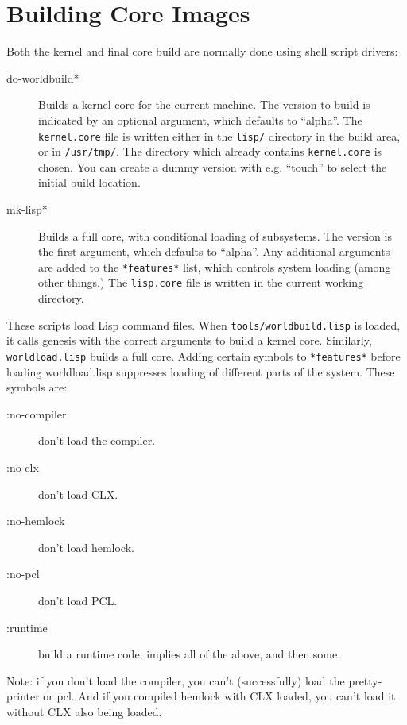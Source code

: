 \section{Building Core Images}
\label{building-cores}
Both the kernel and final core build are normally done using shell script
drivers:
\begin{description}
\item[do-worldbuild*] Builds a kernel core for the current machine.  The
version to build is indicated by an optional argument, which defaults to
``alpha''.  The \verb|kernel.core| file is written either in the \verb|lisp/|
directory in the build area, or in \verb|/usr/tmp/|.  The directory which
already contains \verb|kernel.core| is chosen.  You can create a dummy version
with e.g. ``touch'' to select the initial build location.

\item[mk-lisp*] Builds a full core, with conditional loading of subsystems.
The version is the first argument, which defaults to ``alpha''.  Any additional
arguments are added to the \verb|*features*| list, which controls system
loading (among other things.)  The \verb|lisp.core| file is written in the
current working directory.
\end{description}

These scripts load Lisp command files.  When \verb|tools/worldbuild.lisp| is
loaded, it calls genesis with the correct arguments to build a kernel core.
Similarly, \verb|worldload.lisp|
builds a full core.  Adding certain symbols to \verb|*features*| before
loading worldload.lisp suppresses loading of different parts of the
system.  These symbols are:
\begin{description}
\item[:no-compiler] don't load the compiler.
\item[:no-clx] don't load CLX.
\item[:no-hemlock] don't load hemlock.
\item[:no-pcl] don't load PCL.
\item[:runtime] build a runtime code, implies all of the above, and then some.
\end{description}

Note: if you don't load the compiler, you can't (successfully) load the
pretty-printer or pcl.  And if you compiled hemlock with CLX loaded, you can't
load it without CLX also being loaded.
